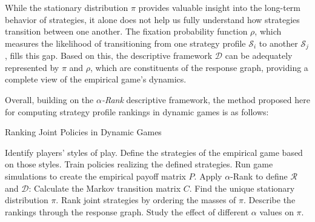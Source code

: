         \noindent
        While the stationary distribution $\pi$ provides valuable insight into the long-term behavior of strategies, it alone does not help us fully understand how strategies transition between one another. The fixation probability function $\rho$, which measures the likelihood of transitioning from one strategy profile $\mathcal{S}_i$ to another $\mathcal{S}_j$, fills this gap. Based on this, the descriptive framework $\mathcal{D}$ can be adequately represented by $\pi$ and $\rho$, which are constituents of the response graph, providing a complete view of the empirical game's dynamics.\tinydouble

        \noindent
        Overall, building on the \emph{$\alpha$-Rank} descriptive framework, the method proposed here for computing strategy profile rankings in dynamic games is as follows:
        \begin{algorithm}
            \caption{Ranking Joint Policies in Dynamic Games}
            \begin{algorithmic}[1]
                \vspace{0.5em}
                \State Identify players' styles of play.
                \State Define the strategies of the empirical game based on those styles.
                \State Train policies realizing the defined strategies.
                \State Run game simulations to create the empirical payoff matrix $P$.
                \State Apply $\alpha$-Rank to define $\mathcal{R}$ and $\mathcal{D}$:
                \vspace{0.5em}
                \State \hspace{1em} Calculate the Markov transition matrix $C$.
                \State \hspace{1em} Find the unique stationary distribution $\pi$.
                \State \hspace{1em} Rank joint strategies by ordering the masses of $\pi$.
                \State \hspace{1em} Describe the rankings through the response graph.
                \State \hspace{1em} Study the effect of different $\alpha$ values on $\pi$.
            \end{algorithmic}
        \end{algorithm}
